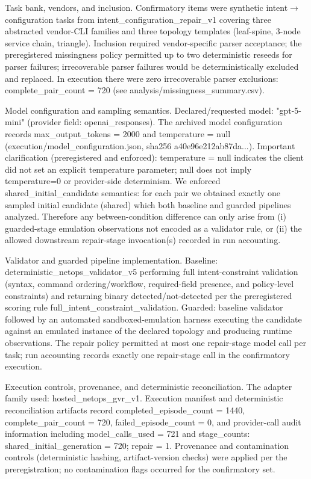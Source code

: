 \documentclass[conference]{IEEEtran}
\begin{document}
Task bank, vendors, and inclusion. Confirmatory items were synthetic intent\ensuremath{\rightarrow}configuration tasks from intent\_configuration\_repair\_v1 covering three abstracted vendor-CLI families and three topology templates (leaf-spine, 3-node service chain, triangle). Inclusion required vendor-specific parser acceptance; the preregistered missingness policy permitted up to two deterministic reseeds for parser failures; irrecoverable parser failures would be deterministically excluded and replaced. In execution there were zero irrecoverable parser exclusions: complete\_pair\_count = 720 (see analysis/missingness\_summary.csv).

Model configuration and sampling semantics. Declared/requested model: "gpt-5-mini" (provider field: openai\_responses). The archived model configuration records max\_output\_tokens = 2000 and temperature = null (execution/model\_configuration.json, sha256 a40e96e212ab87da...). Important clarification (preregistered and enforced): temperature = null indicates the client did not set an explicit temperature parameter; null does not imply temperature=0 or provider-side determinism. We enforced shared\_initial\_candidate semantics: for each pair we obtained exactly one sampled initial candidate (shared) which both baseline and guarded pipelines analyzed. Therefore any between-condition difference can only arise from (i) guarded-stage emulation observations not encoded as a validator rule, or (ii) the allowed downstream repair-stage invocation(s) recorded in run accounting.

Validator and guarded pipeline implementation. Baseline: deterministic\_netops\_validator\_v5 performing full intent-constraint validation (syntax, command ordering/workflow, required-field presence, and policy-level constraints) and returning binary detected/not-detected per the preregistered scoring rule full\_intent\_constraint\_validation. Guarded: baseline validator followed by an automated sandboxed-emulation harness executing the candidate against an emulated instance of the declared topology and producing runtime observations. The repair policy permitted at most one repair-stage model call per task; run accounting records exactly one repair-stage call in the confirmatory execution.

Execution controls, provenance, and deterministic reconciliation. The adapter family used: hosted\_netops\_gvr\_v1. Execution manifest and deterministic reconciliation artifacts record completed\_episode\_count = 1440, complete\_pair\_count = 720, failed\_episode\_count = 0, and provider-call audit information including model\_calls\_used = 721 and stage\_counts: shared\_initial\_generation = 720; repair = 1. Provenance and contamination controls (deterministic hashing, artifact-version checks) were applied per the preregistration; no contamination flags occurred for the confirmatory set.
\end{document}
